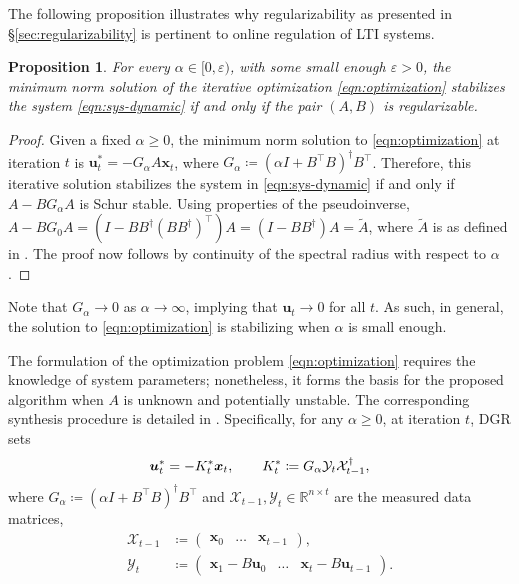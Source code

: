 \documentclass[journal]{IEEEtran}
\newtheorem{proposition}[theorem]{Proposition}
\theoremstyle{definition}
\theoremstyle{remark}
\newcommand\x{{\bm x}}
\def\u{{\bm u}}
\begin{document}
{\color{violet} The following proposition illustrates why regularizability as presented in \S\ref{sec:regularizability} is pertinent to online regulation of LTI systems.
\begin{proposition}
    For every $\alpha \in [0, \varepsilon)$, with some small enough $\varepsilon>0$, the minimum norm solution of the iterative optimization \cref{eqn:optimization} stabilizes the system \cref{eqn:sys-dynamic} if and only if the pair $(A,B)$ is regularizable.
\end{proposition}
\begin{proof}
Given a fixed $\alpha \geq 0$, the minimum norm solution to \cref{eqn:optimization} at iteration $t$ is $\u_t^* = - G_\alpha A \x_t$, where $G_\alpha \coloneqq (\alpha I + B^\intercal B)^\dagger B^\intercal$. Therefore, this iterative solution stabilizes the system in  \cref{eqn:sys-dynamic} if and only if $A - B G_\alpha A$ is Schur stable. Using properties of the pseudoinverse, $A - B G_0 A = (I - B B^\dagger (B B^\dagger)^\intercal) A = (I - B B^\dagger)A = \widetilde{A}$, where $\widetilde{A}$ is as defined in . The proof now follows by continuity of the spectral radius with respect to $\alpha$.
\end{proof}

Note that $G_\alpha \to 0$ as $\alpha \to \infty$, implying that $\u_t \to 0$ for all $t$. As such, in general, the solution to \cref{eqn:optimization} is stabilizing when $\alpha$ is small enough.}
%
The formulation of the optimization problem \cref{eqn:optimization} requires the knowledge of system parameters; nonetheless, it forms the basis for the proposed algorithm when $A$ is unknown and potentially unstable. 
%
The corresponding synthesis procedure is detailed in .
%
Specifically, for any $\alpha \geq 0$, at iteration $t$, \ac{DGR} sets
\begin{equation}
    \label{eqn:opt-input}
    \u_t^*= -K_t^* \x_t, \hspace{7mm} K_t^* \coloneqq G_\alpha \mathcal{Y}_{t} \mathcal{X}_{t-1}^{\dagger},
\end{equation}
{\color{violet}
where $G_\alpha \coloneqq (\alpha I + B^\intercal B)^\dagger B^\intercal$ and $\mathcal{X}_{t-1}, \mathcal{Y}_{t} \in \mathbb{R}^{n \times t}$ are 
the measured data matrices,
\begin{align*}
\mathcal{X}_{t-1} &\coloneqq \begin{pmatrix} \x_0 &\dots & \x_{t-1}\end{pmatrix},\\
\mathcal{Y}_{t} &\coloneqq \begin{pmatrix} \x_1 -B\u_0 &\dots & \x_t -B\u_{t-1}\end{pmatrix}.
\end{align*}}
\end{document}
